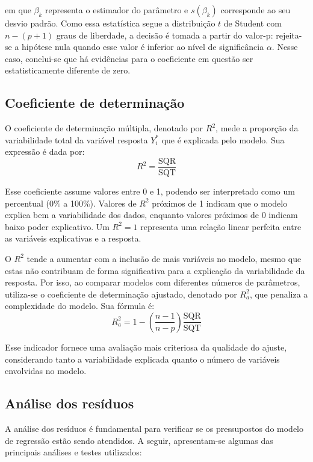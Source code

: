 \documentclass[12pt,a4paper,header]{abnt}
\begin{document}
\noindent em que \(\beta_k\) representa o estimador do parâmetro e \(s(\beta_k)\) corresponde ao seu desvio padrão. Como essa estatística segue a distribuição $t$ de Student com \(n-(p+1)\) graus de liberdade, a decisão é tomada a partir do valor-p: rejeita-se a hipótese nula quando esse valor é inferior ao nível de significância \(\alpha\). Nesse caso, conclui-se que há evidências para o coeficiente em questão ser estatisticamente diferente de zero. 


\subsection{Coeficiente de determinação}
O coeficiente de determinação múltipla, denotado por $R^2$, mede a proporção da variabilidade total da variável resposta \(Y_i^*\) que é explicada pelo modelo. Sua expressão é dada por:
\begin{equation}
    R^2 = \frac{\text{SQR}}{\text{SQT}}
\end{equation}

Esse coeficiente assume valores entre 0 e 1, podendo ser interpretado como um percentual (0\% a 100\%). Valores de $R^2$ próximos de 1 indicam que o modelo explica bem a variabilidade dos dados, enquanto valores próximos de 0 indicam baixo poder explicativo. Um $R^2 = 1$ representa uma relação linear perfeita entre as variáveis explicativas e a resposta.

O $R^2$ tende a aumentar com a inclusão de mais variáveis no modelo, mesmo que estas não contribuam de forma significativa para a explicação da variabilidade da resposta. Por isso, ao comparar modelos com diferentes números de parâmetros, utiliza-se o coeficiente de determinação ajustado, denotado por $R_a^2$, que penaliza a complexidade do modelo. Sua fórmula é:
\begin{equation}
    R_a^2 = 1 - \left( \frac{n - 1}{n - p} \right) \frac{\text{SQR}}{\text{SQT}}
\end{equation}

Esse indicador fornece uma avaliação mais criteriosa da qualidade do ajuste, considerando tanto a variabilidade explicada quanto o número de variáveis envolvidas no modelo.


\subsection{Análise dos resíduos}
A análise dos resíduos é fundamental para verificar se os pressupostos do modelo de regressão estão sendo atendidos. A seguir, apresentam-se algumas das principais análises e testes utilizados:
\end{document}
